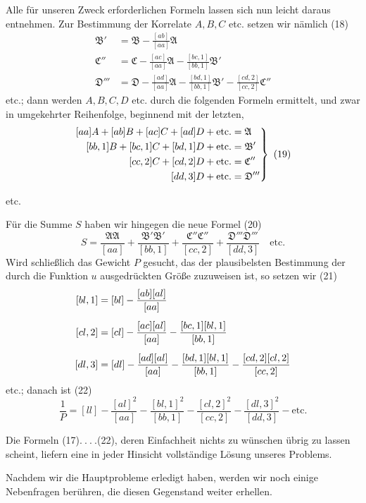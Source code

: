 Alle für unseren Zweck erforderlichen Formeln lassen sich nun leicht daraus entnehmen. Zur Bestimmung der Korrelate \(A,B,C\) etc. setzen wir nämlich (18)
\[
\begin{aligned}
\mathfrak B'&=\mathfrak B-\frac{[ab]}{[aa]}\mathfrak A\\[5pt]
\mathfrak C''&=\mathfrak C-\frac{[ac]}{[aa]}\mathfrak A-\frac{[bc,1]}{[bb,1]}\mathfrak B'\\[5pt]
\mathfrak D'''&=\mathfrak D-\frac{[ad]}{[aa]}\mathfrak A-\frac{[bd,1]}{[bb,1]}\mathfrak B'-\frac{[cd,2]}{[cc,2]}\mathfrak C''
\end{aligned}
\]
etc.; dann werden \(A,B,C,D\) etc. durch die folgenden Formeln ermittelt, und zwar in umgekehrter Reihenfolge, beginnend mit der letzten,
\[
\left.\begin{aligned}\relax
[aa]A+[ab]B+[ac]C+[ad]D+\text{etc.}&=\mathfrak A\\
[bb,1]B+[bc,1]C+[bd,1]D+\text{etc.}&=\mathfrak B'\\
[cc,2]C+[cd,2]D+\text{etc.}&=\mathfrak C''\\
[dd,3]D+\text{etc.}&=\mathfrak D'''
\end{aligned}\right\}\ (19)
\]
\begin{center}etc.\end{center}
Für die Summe \(S\) haben wir hingegen die neue Formel (20)
\[
S=\frac{\mathfrak A\mathfrak A}{[aa]}+\frac{\mathfrak B'\mathfrak B'}{[bb,1]}+\frac{\mathfrak C''\mathfrak C''}{[cc,2]}+\frac{\mathfrak D'''\mathfrak D'''}{[dd,3]}\quad\text{etc.}
\]
Wird schließlich das Gewicht \(P\) gesucht, das der plausibelsten Bestimmung der durch die Funktion \(u\) ausgedrückten Größe zuzuweisen ist, so setzen wir (21)
\[
\begin{aligned}\relax
[bl,1]&=[bl]-\frac{[ab][al]}{[aa]}\\[5pt]
[cl,2]&=[cl]-\frac{[ac][al]}{[aa]}-\frac{[bc,1][bl,1]}{[bb,1]}\\[5pt]
[dl,3]&=[dl]-\frac{[ad][al]}{[aa]}-\frac{[bd,1][bl,1]}{[bb,1]}-\frac{[cd,2][cl,2]}{[cc,2]}
\end{aligned}
\]
etc.; danach ist (22)
\[
\frac1P=[ll]-\frac{[al]^2}{[aa]}-\frac{[bl,1]^2}{[bb,1]}-\frac{[cl,2]^2}{[cc,2]}-\frac{[dl,3]^2}{[dd,3]}-\text{etc.}
\]

Die Formeln (17)\(.\ .\ .\ .\)(22), deren Einfachheit nichts zu wünschen übrig zu lassen scheint, liefern eine in jeder Hinsicht vollständige Lösung unseres Problems.

Nachdem wir die Hauptprobleme erledigt haben, werden wir noch einige Nebenfragen berühren, die diesen Gegenstand weiter erhellen.

